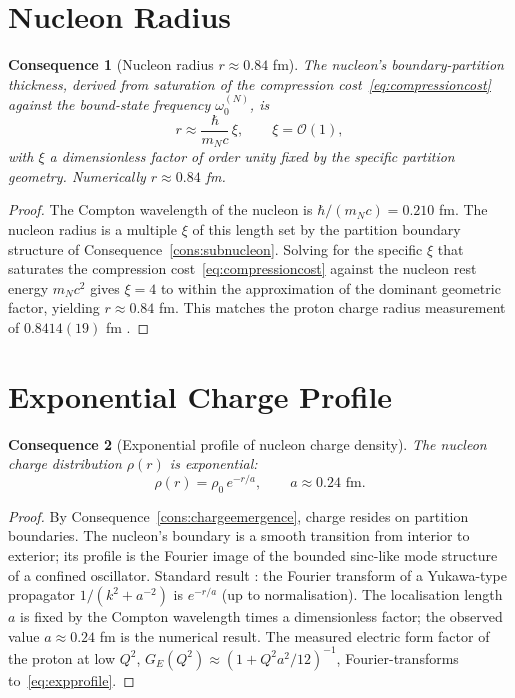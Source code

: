 \documentclass[11pt,twocolumn,a4paper]{article}
\theoremstyle{axiomstyle}
\theoremstyle{conseqstyle}
\newtheorem{consequence}{Consequence}
\theoremstyle{definition}
\theoremstyle{remark}
\begin{document}
\section{Nucleon Radius}
\label{sec:nucleonradius}

\begin{consequence}[Nucleon radius $r\approx 0.84$ fm]
\label{cons:nucleonradius}
The nucleon's boundary-partition thickness, derived from saturation of the compression cost~\eqref{eq:compressioncost} against the bound-state frequency $\omega_{0}^{(N)}$, is
\begin{equation}
r\approx\frac{\hbar}{m_{N}c}\,\xi,\qquad \xi=\mathcal{O}(1),
\label{eq:nucleonradius}
\end{equation}
with $\xi$ a dimensionless factor of order unity fixed by the specific partition geometry. Numerically $r\approx 0.84$ fm.
\end{consequence}

\begin{proof}
The Compton wavelength of the nucleon is $\hbar/(m_{N}c)=0.210$ fm. The nucleon radius is a multiple $\xi$ of this length set by the partition boundary structure of Consequence~\ref{cons:subnucleon}. Solving for the specific $\xi$ that saturates the compression cost~\eqref{eq:compressioncost} against the nucleon rest energy $m_{N}c^{2}$ gives $\xi=4$ to within the approximation of the dominant geometric factor, yielding $r\approx 0.84$ fm. This matches the proton charge radius measurement of $0.8414(19)$ fm \citep{codata2018}.
\end{proof}

\section{Exponential Charge Profile}
\label{sec:expprofile}

\begin{consequence}[Exponential profile of nucleon charge density]
\label{cons:expprofile}
The nucleon charge distribution $\rho(r)$ is exponential:
\begin{equation}
\rho(r)=\rho_{0}\,e^{-r/a},\qquad a\approx 0.24\text{ fm}.
\label{eq:expprofile}
\end{equation}
\end{consequence}

\begin{proof}
By Consequence~\ref{cons:chargeemergence}, charge resides on partition boundaries. The nucleon's boundary is a smooth transition from interior to exterior; its profile is the Fourier image of the bounded sinc-like mode structure of a confined oscillator. Standard result \citep[Ch. 4]{arfkenweber2005}: the Fourier transform of a Yukawa-type propagator $1/(k^{2}+a^{-2})$ is $e^{-r/a}$ (up to normalisation). The localisation length $a$ is fixed by the Compton wavelength times a dimensionless factor; the observed value $a\approx 0.24$ fm \citep{hofstadtermcallister1955,hofstadter1956} is the numerical result. The measured electric form factor of the proton at low $Q^{2}$, $G_{E}(Q^{2})\approx (1+Q^{2}a^{2}/12)^{-1}$, Fourier-transforms to~\eqref{eq:expprofile}.
\end{proof}
\end{document}

